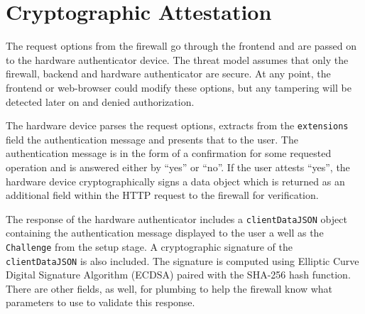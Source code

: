 


\section{Cryptographic Attestation}\label{Sec:CryptographicAttestation}

The request options from the firewall go through the frontend and are passed on to the hardware authenticator device. The threat model assumes that only the firewall, backend and hardware authenticator are secure. At any point, the frontend or web-browser could modify these options, but any tampering will be detected later on and denied authorization. 

The hardware device parses the request options, extracts from the \lstinline{extensions} field the authentication message and presents that to the user. The authentication message is in the form of a confirmation for some requested operation and is answered either by ``yes'' or ``no''. If the user attests ``yes'', the hardware device cryptographically signs a data object which is returned as an additional field within the HTTP request to the firewall for verification.

The response of the hardware authenticator includes a \lstinline{clientDataJSON} object containing the authentication message displayed to the user a well as the \lstinline{Challenge} from the setup stage. A cryptographic signature of the \lstinline{clientDataJSON} is also included. The signature is computed using Elliptic Curve Digital Signature Algorithm (ECDSA) paired with the SHA-256 hash function. There are other fields, as well, for plumbing to help the firewall know what parameters to use to validate this response.

